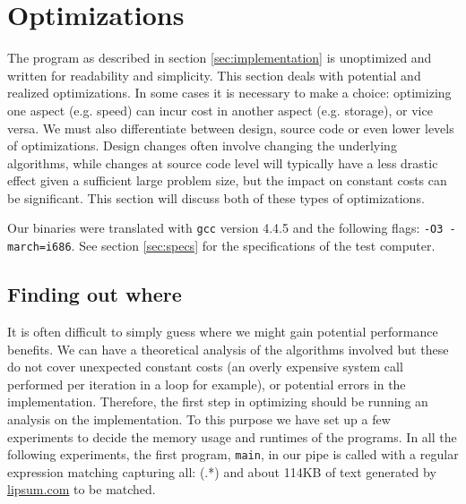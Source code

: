 \section{Optimizations}
The program as described in section \vref{sec:implementation} is
unoptimized and written for readability and simplicity. This section
deals with potential and realized optimizations. In some cases it is necessary to make a choice: 
optimizing one aspect (e.g. speed) can incur cost in another aspect (e.g. storage), or vice versa. 
We must also differentiate between design, source code or even lower levels of optimizations. Design changes often involve changing the
underlying algorithms, while changes at source code level will typically have a less drastic effect given a sufficient large problem size, but the impact on constant costs can be significant. This section will discuss both of these types of optimizations.

Our binaries were translated with \texttt{gcc} version 4.4.5 and the following flags:
\texttt{-O3 -march=i686}. See section
\vref{sec:specs} for the specifications of the test computer.

\subsection{Finding out where}
\label{sec:finding_out_where}
It is often difficult to simply guess where we might gain potential performance benefits. We can have a theoretical analysis of the algorithms involved but these do not cover unexpected constant costs (an overly expensive system call performed per iteration in a loop for example), or potential errors in the implementation.
Therefore, the first step in optimizing should be running an analysis on the implementation. To this
purpose we have set up a few experiments to decide the memory usage
and runtimes of the programs. In all the following experiments, the
first program, \texttt{main}, in our pipe is called with a regular
expression matching capturing all: \textsf{(.*)} and about 114KB of
text generated by \url{lipsum.com} to be matched. 


